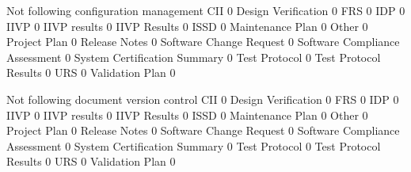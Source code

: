 \documentclass{article}
\begin{document}
\begin{Schunk}
\begin{Soutput}
                                 Not following configuration management
  CII                                                                 0
  Design Verification                                                 0
  FRS                                                                 0
  IDP                                                                 0
  IIVP                                                                0
  IIVP results                                                        0
  IIVP Results                                                        0
  ISSD                                                                0
  Maintenance Plan                                                    0
  Other                                                               0
  Project Plan                                                        0
  Release Notes                                                       0
  Software Change Request                                             0
  Software Compliance Assessment                                      0
  System Certification Summary                                        0
  Test Protocol                                                       0
  Test Protocol Results                                               0
  URS                                                                 0
  Validation Plan                                                     0
                                
                                 Not following document version control
  CII                                                                 0
  Design Verification                                                 0
  FRS                                                                 0
  IDP                                                                 0
  IIVP                                                                0
  IIVP results                                                        0
  IIVP Results                                                        0
  ISSD                                                                0
  Maintenance Plan                                                    0
  Other                                                               0
  Project Plan                                                        0
  Release Notes                                                       0
  Software Change Request                                             0
  Software Compliance Assessment                                      0
  System Certification Summary                                        0
  Test Protocol                                                       0
  Test Protocol Results                                               0
  URS                                                                 0
  Validation Plan                                                     0
                                

\end{Soutput}
\end{Schunk}
\end{document}
